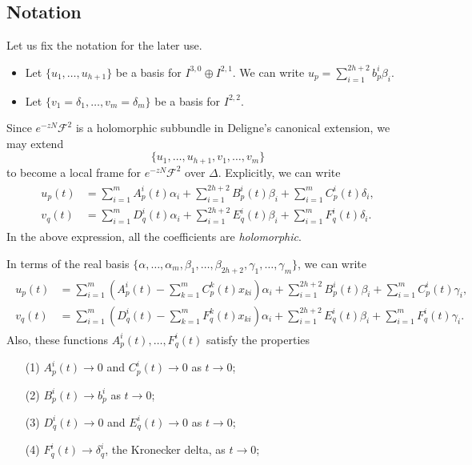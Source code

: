 \subsection*{Notation}
Let us fix the notation for the later use.
\begin{itemize}
\item Let \(\{u_{1},\ldots,u_{h+1}\}\) be
a basis for \(I^{3,0}\oplus I^{2,1}\). We can
write \(u_{p}=\sum_{i=1}^{2h+2} b^{i}_{p} \beta_{i}\).
\item Let \(\{v_{1}=\delta_{1},\ldots,v_{m}=\delta_{m}\}\) be a basis for \(I^{2,2}\). 
\end{itemize}
Since \(e^{-zN}\mathcal{F}^{2}\) is a holomorphic subbundle in 
Deligne's canonical extension, we may extend
\begin{equation}
\{u_{1},\ldots,u_{h+1},v_{1},\ldots,v_{m}\}
\end{equation}
to become a local frame for \(e^{-zN}\mathcal{F}^{2}\)
over \(\Delta\). Explicitly, we can write
\begin{align}
\begin{split}
u_{p}(t) &= \sum_{i=1}^{m} A^{i}_{p}(t) \alpha_{i}+
\sum_{i=1}^{2h+2} B^{i}_{p}(t) \beta_{i} + \sum_{i=1}^{m} C^{i}_{p}(t) \delta_{i},\\
v_{q}(t) &= \sum_{i=1}^{m} D^{i}_{q}(t) \alpha_{i}+
\sum_{i=1}^{2h+2} E^{i}_{q}(t) \beta_{i} + \sum_{i=1}^{m} F^{i}_{q}(t) \delta_{i}.
\end{split}
\end{align}
In the above expression, all the coefficients are \emph{holomorphic}.

In terms of the real basis
\(\{\alpha,\ldots,\alpha_{m},\beta_{1},\ldots,\beta_{2h+2},\gamma_{1},\ldots,\gamma_{m}\}\), 
we can write
\begin{align}
\begin{split}
u_{p}(t) &= \sum_{i=1}^{m} \left(A^{i}_{p}(t)-
\sum_{k=1}^{m}C_{p}^{k}(t)x_{ki}\right) \alpha_{i}+
\sum_{i=1}^{2h+2} B^{i}_{p}(t) \beta_{i} + 
\sum_{i=1}^{m} C^{i}_{p}(t) \gamma_{i},\\
v_{q}(t) &= \sum_{i=1}^{m} \left(D^{i}_{q}(t)-
\sum_{k=1}^{m}F_{q}^{k}(t)x_{ki}\right) \alpha_{i}+
\sum_{i=1}^{2h+2} E^{i}_{q}(t) \beta_{i} + \sum_{i=1}^{m} F^{i}_{q}(t) \gamma_{i}.
\end{split}
\end{align}
Also, these functions \(A^{i}_{p}(t),\ldots,F_{q}^{i}(t)\) satisfy the properties
\begin{itemize}
\item[(1)] \(A_{p}^{i}(t)\to 0\) and \(C_{p}^{i}(t)\to 0\) as \(t\to 0\);
\item[(2)] \(B_{p}^{i}(t)\to b_{p}^{i}\) as \(t\to 0\);
\item[(3)] \(D_{q}^{i}(t)\to 0\) and \(E_{q}^{i}(t)\to 0\) as \(t\to 0\);
\item[(4)] \(F_{q}^{i}(t)\to \delta_{q}^{i}\), the Kronecker delta, as \(t\to 0\);
\end{itemize}

